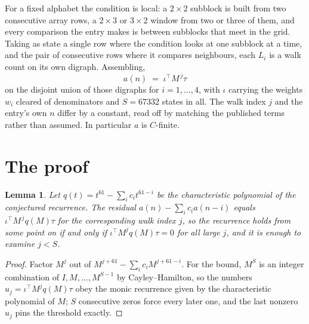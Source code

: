 \documentclass[11pt,a4paper]{article}
\theoremstyle{plain}
\newtheorem{lemma}[theorem]{Lemma}
\theoremstyle{definition}
\begin{document}
For a fixed alphabet the condition is local: a $2\times2$ subblock is built from two
consecutive array rows, a $2\times3$ or $3\times2$ window from two or three of them, and every
comparison the entry makes is between subblocks that meet in the grid. Taking as state a single
row where the condition looks at one subblock at a time, and the pair of consecutive rows where
it compares neighbours, each $L_i$ is a walk count on its own digraph. Assembling,
\[
a(n)\;=\;\iota^{\!\top}M^{\,j}\tau
\]
on the disjoint union of those digraphs for $i=1,\dots,4$, with $\iota$ carrying the weights
$w_i$ cleared of denominators and $S=67332$ states in all. The walk index $j$ and the entry's own
$n$ differ by a constant, read off by matching the published terms rather than assumed. In
particular $a$ is $C$-finite.

\section{The proof}

\begin{lemma}\label{lem:crit}
Let $q(t)=t^{61}-\sum_i c_it^{61-i}$ be the characteristic polynomial of the
conjectured recurrence. The residual $a(n)-\sum_ic_ia(n-i)$ equals
$\iota^{\!\top}M^{\,j}q(M)\tau$ for the corresponding walk index $j$, so the recurrence
holds from some point on if and only if $\iota^{\!\top}M^{j}q(M)\tau=0$ for all large $j$,
and it is enough to examine $j<S$.
\end{lemma}

\begin{proof}
Factor $M^{j}$ out of $M^{j+61}-\sum_ic_iM^{j+61-i}$. For the bound, $M^{S}$
is an integer combination of $I,M,\dots,M^{S-1}$ by Cayley--Hamilton, so the numbers
$u_j=\iota^{\!\top}M^{j}q(M)\tau$ obey the monic recurrence given by the characteristic
polynomial of $M$; $S$ consecutive zeros force every later one, and the last nonzero $u_j$
pins the threshold exactly.
\end{proof}
\end{document}
